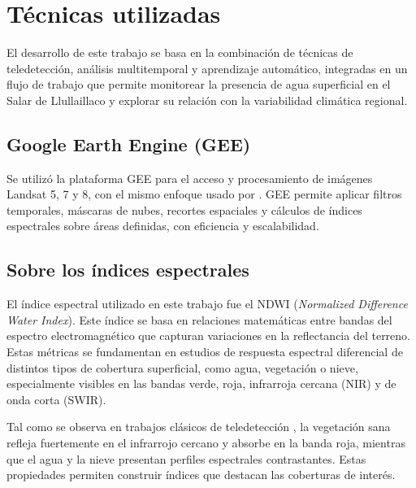 
\section{Técnicas utilizadas}

El desarrollo de este trabajo se basa en la combinación de técnicas de teledetección, análisis multitemporal y aprendizaje automático, integradas en un flujo de trabajo que permite monitorear la presencia de agua superficial en el Salar de Llullaillaco y explorar su relación con la variabilidad climática regional.

\subsection{Google Earth Engine (GEE)}

Se utilizó la plataforma GEE para el acceso y procesamiento de imágenes Landsat 5, 7 y 8, con el mismo enfoque usado por \cite{ferran2024ceia, roldan2023ceia}. GEE permite aplicar filtros temporales, máscaras de nubes, recortes espaciales y cálculos de índices espectrales sobre áreas definidas, con eficiencia y escalabilidad.


\subsection{Sobre los índices espectrales}

El índice espectral utilizado en este trabajo fue el NDWI (\textit{Normalized Difference Water Index}). Este índice se basa en relaciones matemáticas entre bandas del espectro electromagnético que capturan variaciones en la reflectancia del terreno. Estas métricas se fundamentan en estudios de respuesta espectral diferencial de distintos tipos de cobertura superficial, como agua, vegetación o nieve, especialmente visibles en las bandas verde, roja, infrarroja cercana (NIR) y de onda corta (SWIR).

Tal como se observa en trabajos clásicos de teledetección \cite{tucker1979red, huete1988soil}, la vegetación sana refleja fuertemente en el infrarrojo cercano y absorbe en la banda roja, mientras que el agua y la nieve presentan perfiles espectrales contrastantes. Estas propiedades permiten construir índices que destacan las coberturas de interés.


